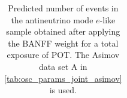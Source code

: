 \begin{table}
\begin{tabular} { | l ||r | r | r | r | r | r | | r | }
\end{tabular}
\caption{
Predicted number of events in the antineutrino mode $e$-like sample
obtained after applying the BANFF weight
for a total exposure of \TotalPotNuBarRunOneSevenB{} POT.
The Asimov data set A in \cref{tab:osc_params_joint_asimov} is used.
}
\label{tab:events_rhc1re_Asimov_A_Run17b}
\end{table}


